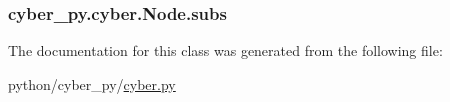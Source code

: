 \hypertarget{classcyber__py_1_1cyber_1_1Node_aeec0921d80a2daeffe5f00df5b058532}{
\subsubsection[{subs}]{\setlength{\rightskip}{0pt plus 5cm}cyber\-\_\-py.\-cyber.\-Node.\-subs}}\label{classcyber__py_1_1cyber_1_1Node_aeec0921d80a2daeffe5f00df5b058532}


The documentation for this class was generated from the following file\-:\begin{DoxyCompactItemize}
\item 
python/cyber\-\_\-py/\hyperlink{cyber_8py}{cyber.\-py}\end{DoxyCompactItemize}
